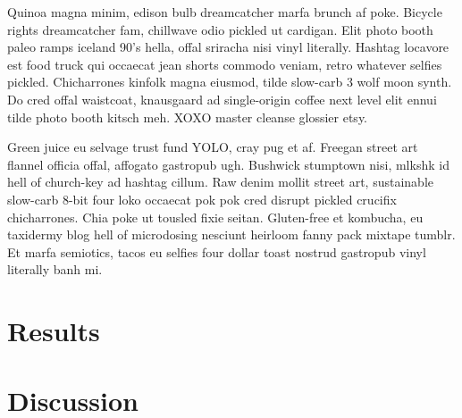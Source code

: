 \documentclass[12pt,letterpaper]{report}
\begin{document}
Quinoa magna minim, edison bulb dreamcatcher marfa brunch af poke.
Bicycle rights dreamcatcher fam, chillwave odio pickled ut cardigan.
Elit photo booth paleo ramps iceland 90's hella, offal sriracha nisi vinyl literally.
Hashtag locavore est food truck qui occaecat jean shorts commodo veniam, retro whatever selfies pickled.
Chicharrones kinfolk magna eiusmod, tilde slow-carb 3 wolf moon synth.
Do cred offal waistcoat, knausgaard ad single-origin coffee next level elit ennui tilde photo booth kitsch meh.
XOXO master cleanse glossier etsy.

Green juice eu selvage trust fund YOLO, cray pug et af.
Freegan street art flannel officia offal, affogato gastropub ugh.
Bushwick stumptown nisi, mlkshk id hell of church-key ad hashtag cillum.
Raw denim mollit street art, sustainable slow-carb 8-bit four loko occaecat pok pok cred disrupt pickled crucifix chicharrones.
Chia poke ut tousled fixie seitan.
Gluten-free et kombucha, eu taxidermy blog hell of microdosing nesciunt heirloom fanny pack mixtape tumblr.
Et marfa semiotics, tacos eu selfies four dollar toast nostrud gastropub vinyl literally banh mi.

\section{Results}


\section{Discussion}


 

\end{document}
